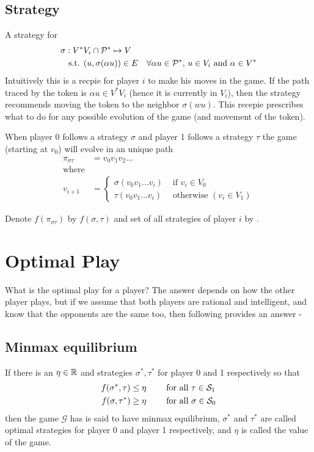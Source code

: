 \subsection{Strategy}
A strategy for  
\begin{align}
    \sigma &: V^{*}V_i \cap \mathcal{P}^{*} \mapsto V \\
    &\text{ s.t. } (u,\sigma(\alpha u)) \in E \quad \forall \alpha u \in \mathcal{P}^{*},\, u \in V_i \text{ and } \alpha \in V^*
\end{align}
Intuitively this is a recpie for player $i$ to make his moves in the game. If the path traced by the token is $\alpha u \in V^{*}V_i$ (hence it is currently in $V_i$), then the strategy recommends moving the token to the neighbor $\sigma(wu)$. This recepie prescribes what to do for any possible evolution of the game (and movement of the token).

When player 0 follows a strategy $\sigma$ and player 1 follows a strategy $\tau$ the game (starting at $v_0$) will evolve in an unique path 
\begin{align}
    \pi_{\sigma\tau} &= v_0v_1v_2\ldots\\
    \text{where}\nonumber\\
    v_{i+1} &= 
\begin{cases}
    \sigma(v_0v_1\ldots v_i) & \text{ if } v_i \in V_0\\
    \tau(v_0v_1\ldots v_i) & \text{ otherwise } (v_i \in V_1)
\end{cases}
\end{align}

Denote $f(\pi_{\sigma\tau})$ by $f(\sigma,\tau)$ and set of all strategies of player $i$ by .
\section{Optimal Play}
What is the optimal play for a player? The answer depends on how the other player plays, but if we assume that both players are rational and intelligent, and know that the opponents are the same too, then following provides an answer - 

\subsection{Minmax equilibrium}
If there is an $\eta \in \mathbb{R}$ and strategies $\sigma^*,\tau^*$ for player 0 and 1 respectively so that
\begin{align}
    f(\sigma^*,\tau) \leq \eta \qquad & \text{ for all } \tau \in \mathcal{S}_1  \label{eq:MinMax0} \\
    f(\sigma, \tau^*)  \geq \eta \qquad & \text{ for all } \sigma \in \mathcal{S}_0 \label{eq:MinMax1}
\end{align}
then the game $\mathcal{G}$ has is said to have minmax equilibrium, $\sigma^*$ and $\tau^*$ are called optimal strategies for player 0 and player 1 respectively, and $\eta$ is called the value of the game.

